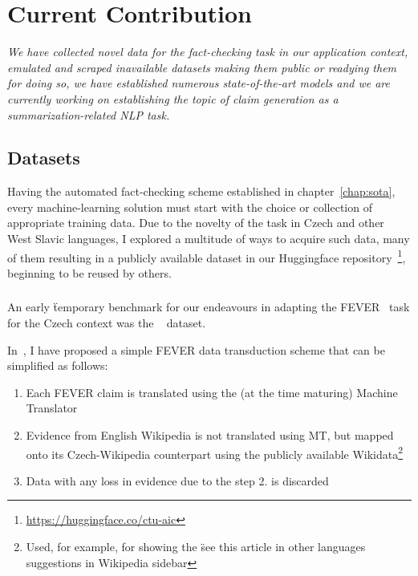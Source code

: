 
\chapter{Current Contribution}
\label{chap:contribution}

\textit{We have collected novel data for the fact-checking task in our application context, emulated and scraped inavailable datasets making them public or readying them for doing so, we have established numerous state-of-the-art models and we are currently working on establishing the topic of claim generation as a summarization-related NLP task.}

\section{Datasets}
Having the automated fact-checking scheme established in chapter~\ref{chap:sota}, every machine-learning solution must start with the choice or collection of appropriate training data.
Due to the novelty of the task in Czech and other West Slavic languages, I explored a multitude of ways to acquire such data, many of them resulting in a publicly available dataset in our Huggingface repository~\footnote{\url{https://huggingface.co/ctu-aic}}, beginning to be reused by others. 

\subsection{\FCZ}
An early \"{temporary benchmark} for our endeavours in adapting the FEVER~\cite{fever} task for the Czech context was the \FCZ~\cite{lrev} dataset.

In~\cite{diplomka}, I have proposed a simple FEVER data transduction scheme that can be simplified as follows:

\begin{enumerate}
    \item Each FEVER claim is translated using the (at the time maturing) Machine Translator
    \item Evidence from English Wikipedia is not translated using MT, but mapped onto its Czech-Wikipedia counterpart using the publicly available Wikidata\footnote{Used, for example, for showing the \"{see this article in other languages} suggestions in Wikipedia sidebar}
    \item Data with any loss in evidence due to the step 2. is discarded
\end{enumerate}

